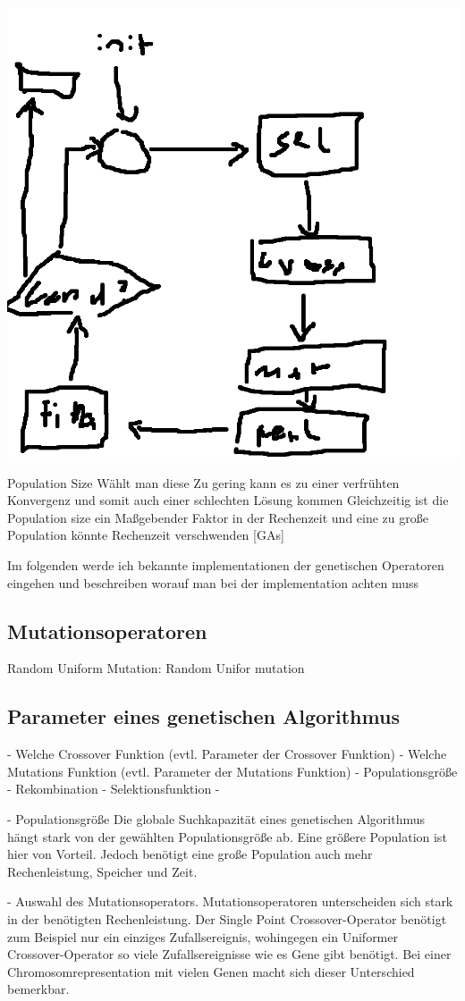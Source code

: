 \includegraphics[scale=1.0]{images/Genetic_Algorithm_Flowchart.png}



Population Size
Wählt man diese Zu gering kann es zu einer verfrühten Konvergenz und somit auch einer schlechten Lösung kommen
Gleichzeitig ist die Population size ein Maßgebender Faktor in der Rechenzeit und eine zu große Population könnte 
Rechenzeit verschwenden [GAs]




Im folgenden werde ich bekannte implementationen der genetischen Operatoren eingehen und beschreiben worauf man bei der implementation achten muss

\subsection*{Mutationsoperatoren}
Random Uniform Mutation:
Random Unifor mutation 


\subsection*{Parameter eines genetischen Algorithmus}
- Welche Crossover Funktion (evtl. Parameter der Crossover Funktion)
- Welche Mutations Funktion (evtl. Parameter der Mutations Funktion)
- Populationsgröße
- Rekombination
- Selektionsfunktion
- 

- Populationsgröße
Die globale Suchkapazität eines genetischen Algorithmus hängt stark von
der gewählten Populationsgröße ab. Eine größere Population ist hier von Vorteil.
Jedoch benötigt eine große Population auch mehr Rechenleistung, Speicher und Zeit.~\cite*{TerminologiesAndOperators}

- Auswahl des Mutationsoperators.
Mutationsoperatoren unterscheiden sich stark in der benötigten Rechenleistung.
Der Single Point Crossover-Operator benötigt zum Beispiel nur ein einziges Zufallsereignis, wohingegen
ein Uniformer Crossover-Operator so viele Zufallsereignisse wie es Gene gibt benötigt.
Bei einer Chromosomrepresentation mit vielen Genen macht sich dieser Unterschied bemerkbar.
